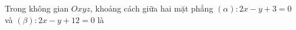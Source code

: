 \begin{ex}
Trong không gian $Oxyz$, khoảng cách giữa hai mặt phẳng $(\alpha)\colon 2x-y+3=0$ và $(\beta)\colon 2x-y+12=0$ là
\end{ex}
